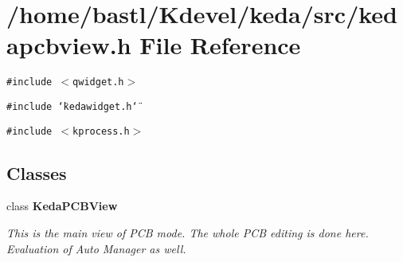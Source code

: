 \section{/home/bastl/Kdevel/keda/src/kedapcbview.h File Reference}
\label{kedapcbview_8h}
{\tt \#include $<$qwidget.h$>$}\par
{\tt \#include \char`\"{}kedawidget.h\char`\"{}}\par
{\tt \#include $<$kprocess.h$>$}\par
\subsection*{Classes}
\begin{CompactItemize}
\item 
class {\bf Keda\-PCBView}
\begin{CompactList}\small\item\em This is the main view of PCB mode. The whole PCB editing is done here. Evaluation of Auto Manager as well. \item\end{CompactList}\end{CompactItemize}
